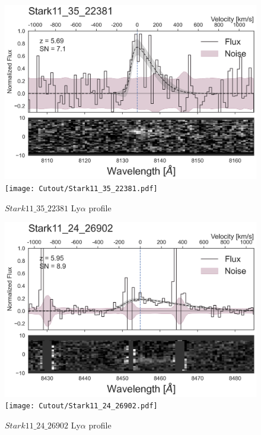 \documentclass[12pt,english]{article}
\begin{document}
\begin{figure}
\begin{center}\includegraphics[width=12cm, trim=0.1cm 0cm 0cm -1cm]{LyaProfiles/Stark11_35_22381.png}
\texttt{[image: Cutout/Stark11\_35\_22381.pdf]}
\caption{$Stark11\_35\_22381$ Ly$\alpha$ profile}
\end{center}
\end{figure}
\clearpage
\begin{figure}
\begin{center}\includegraphics[width=12cm, trim=0.1cm 0cm 0cm -1cm]{LyaProfiles/Stark11_24_26902.png}
\texttt{[image: Cutout/Stark11\_24\_26902.pdf]}
\caption{$Stark11\_24\_26902$ Ly$\alpha$ profile}
\end{center}
\end{figure}
\clearpage
\end{document}
